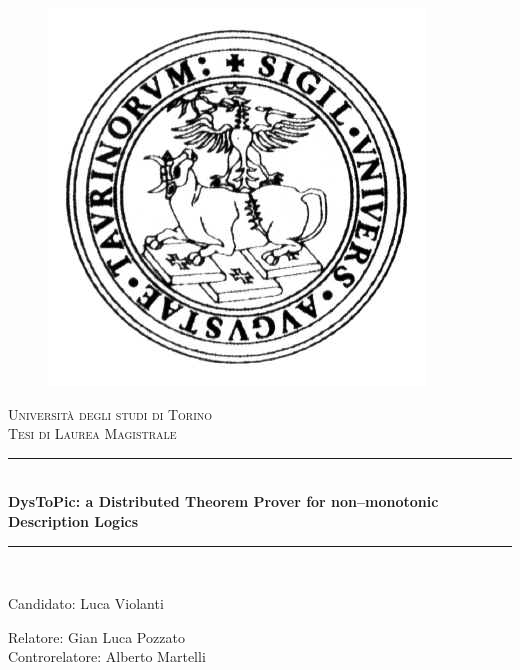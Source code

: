 \documentclass[a4paper, 11pt, oneside]{duthesis}
\newcommand{\HRule}{\rule{\linewidth}{0.5mm}}
\begin{document}
\begin{titlepage}
\begin{center}

\begin{figure}[htp]
\centering
\includegraphics[scale=0.25]{img/logo_unito.png}
\label{}
\end{figure}

\textsc{\LARGE Università degli studi di Torino}\\[2cm]
\textsc{\Large Tesi di Laurea Magistrale}\\[3cm]


\HRule \\[0.4cm]
{ \huge \bfseries DysToPic: a Distributed Theorem Prover for non--monotonic Description Logics}\\[0.2cm]
\HRule \\[3cm]

\vfill

\begin{multicols}{2}
\begin{flushleft}
	{\Large Candidato: Luca Violanti}
\end{flushleft}
\columnbreak
\begin{flushright}
	{\Large Relatore: Gian Luca Pozzato\\[0.5cm]
	Controrelatore: Alberto Martelli }
\end{flushright}
\end{multicols}

\end{center}
\end{titlepage}
\newpage
\end{document}

